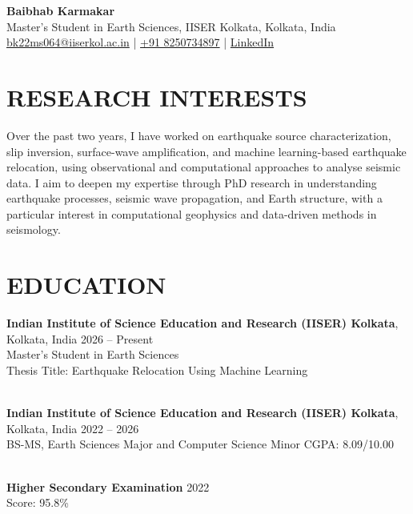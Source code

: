 \documentclass[a4paper,9pt]{extarticle}
\begin{document}
\pagestyle{fancy}
\renewcommand{\headrulewidth}{0pt}
\fancyhead{}
\thispagestyle{empty} %

\begin{flushleft}
\textbf{\LARGE Baibhab Karmakar}\\[2pt] %
Master's Student in Earth Sciences, IISER Kolkata, Kolkata, India
\\ \href{mailto:bk22ms064@iiserkol.ac.in}{bk22ms064@iiserkol.ac.in} | \href{tel:+918250734897}{+91 8250734897} | \href{https://www.linkedin.com/in/baibhab-karmakar-237249195/}{LinkedIn} %
\end{flushleft}

\section*{RESEARCH INTERESTS}
\noindent
Over the past two years, I have worked on earthquake source characterization, slip inversion, surface-wave amplification, and machine learning-based earthquake relocation, using observational and computational approaches to analyse seismic data.  I aim to deepen my expertise through PhD research in understanding earthquake processes, seismic wave propagation, and Earth structure, with a particular interest in computational geophysics and data-driven methods in seismology.
\section*{EDUCATION}
\noindent
\textbf{Indian Institute of Science Education and Research (IISER) Kolkata}, Kolkata, India \hfill 2026 -- Present\\
Master's Student in Earth Sciences \\
Thesis Title: Earthquake Relocation Using Machine Learning %

\noindent\\
\textbf{Indian Institute of Science Education and Research (IISER) Kolkata}, Kolkata, India \hfill 2022 -- 2026\\
BS-MS, Earth Sciences Major and Computer Science Minor \hfill CGPA: 8.09/10.00

\noindent\\
\textbf{Higher Secondary Examination} \hfill 2022\\
Score: 95.8\%
\end{document}
